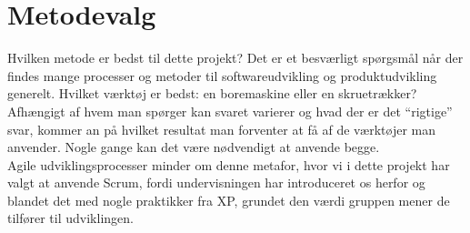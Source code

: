 \section{Metodevalg}\label{sec:valgafprocesmodel}
Hvilken metode er bedst til dette projekt? Det er et besværligt spørgsmål når der findes mange processer 
og metoder til softwareudvikling og produktudvikling generelt. Hvilket værktøj er bedst: en boremaskine 
eller en skruetrækker? Afhængigt af hvem man spørger kan svaret varierer og hvad der er det “rigtige” svar, 
kommer an på hvilket resultat man forventer at få af de værktøjer man anvender. Nogle gange kan det være nødvendigt at anvende begge. \\

Agile udviklingsprocesser minder om denne metafor, hvor vi i dette projekt har valgt at anvende Scrum, 
fordi undervisningen har introduceret os herfor og blandet det med nogle praktikker fra XP, grundet den værdi gruppen mener de tilfører til udviklingen.